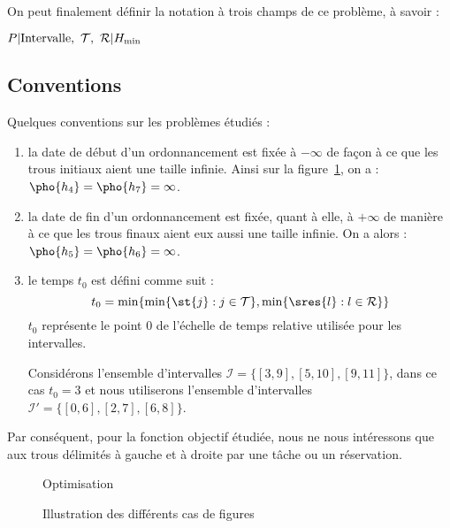 \documentclass[a4paper,9pt]{report}
\begin{document}
    On peut finalement définir la notation à trois champs de ce problème, à savoir : 
    \begin{center}
        $P \arrowvert \mbox{Intervalle},\ \mathcal{T},\ \mathcal{R} \arrowvert H_{\min}$
    \end{center}
    

\subsection{Conventions}
    Quelques conventions sur les problèmes étudiés : \begin{enumerate}
        \item la date de début d'un ordonnancement est fixée à $- \infty$ de façon à
            ce que les trous initiaux aient une taille infinie. Ainsi sur la figure~\ref{prescas},
            on a : $\pho{h_4} = \pho{h_7} = \infty$.
        \item la date de fin d'un ordonnancement est fixée, quant à elle, à
            $+\infty$ de manière à ce que les trous finaux aient eux aussi une taille infinie. On a
            alors : $\pho{h_5} = \pho{h_6} = \infty$.
        \item le temps $t_0$ est défini comme suit : \[
                t_0 = \min\{\min\{\st{j} : j \in \mathcal{T}\}, \min\{\sres{l} : l \in \mathcal{R}\}\}
            \]
            $t_0$ représente le point $0$ de l'échelle de temps relative utilisée pour les
            intervalles.

            Considérons l'ensemble d'intervalles $\mathcal{I} = \{[3,9], [5,10], [9,11]\}$, dans ce
            cas $t_0 = 3$ et nous utiliserons l'ensemble d'intervalles $\mathcal{I}' = \{[0,6],
            [2,7], [6,8]\}$.
    \end{enumerate}

    Par conséquent, pour la fonction objectif étudiée, nous ne
    nous intéressons que aux trous délimités à gauche et à droite par une tâche ou un réservation.

\begin{figure}
    \begin{center}
        \begin{ordo}[10]{3}{1}{9}
            Optimisation




        \end{ordo}
    \end{center}
    \caption{Illustration des différents cas de figures}
    \label{prescas}
\end{figure}
\end{document}
